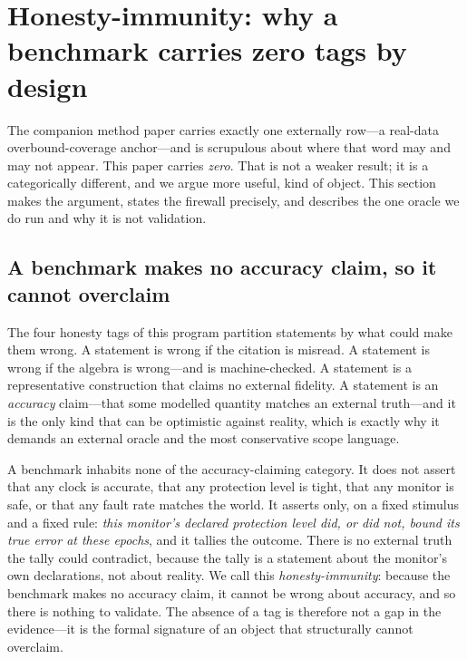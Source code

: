 \section{Honesty-immunity: why a benchmark carries zero \Validated{} tags by design}
\label{sec:immunity}

The companion method paper \citep{baweja2026cti} carries exactly one externally
\Validated{} row---a real-data overbound-coverage anchor---and is scrupulous about
where that word may and may not appear. This paper carries \emph{zero}. That is not
a weaker result; it is a categorically different, and we argue more useful, kind of
object. This section makes the argument, states the firewall precisely, and
describes the one oracle we do run and why it is not validation.

\subsection{A benchmark makes no accuracy claim, so it cannot overclaim}
\label{sec:noaccuracy}

The four honesty tags of this program partition statements by what could make them
wrong. A \Cited{} statement is wrong if the citation is misread. A \Proven{}
statement is wrong if the algebra is wrong---and is machine-checked. A \Modelled{}
statement is a representative construction that claims no external fidelity. A
\Validated{} statement is an \emph{accuracy} claim---that some modelled quantity
matches an external truth---and it is the only kind that can be optimistic against
reality, which is exactly why it demands an external oracle and the most conservative
scope language.

A benchmark inhabits none of the accuracy-claiming category. It does not assert
that any clock is accurate, that any protection level is tight, that any monitor is
safe, or that any fault rate matches the world. It asserts only, on a fixed
stimulus and a fixed rule: \emph{this monitor's declared protection level did, or
did not, bound its true error at these epochs}, and it tallies the outcome. There
is no external truth the tally could contradict, because the tally is a statement
about the monitor's own declarations, not about reality. We call this
\emph{honesty-immunity}: because the benchmark makes no accuracy claim, it cannot
be wrong about accuracy, and so there is nothing to validate. The absence of a
\Validated{} tag is therefore not a gap in the evidence---it is the formal
signature of an object that structurally cannot overclaim.

